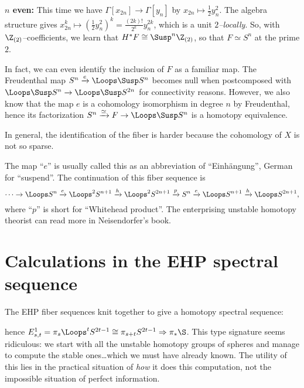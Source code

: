 \textbf{$n$ even:} This time we have $\Gamma[x_{2n}] \to \Gamma[y_n]$ by $x_{2n} \mapsto \frac{1}{2} y_n^2$.  The algebra structure gives $x_{2n}^k \mapsto (\frac{1}{2} y_n^2)^k = \frac{(2k)!}{2^k} y_n^{2k}$, which is a unit \emph{$2$--locally}.  So, with $\Z_{(2)}$--coefficients, we learn that $H^* F \cong \Susp^n \Z_{(2)}$, so that $F \simeq S^n$ at the prime $2$.

In fact, we can even identify the inclusion of $F$ as a familiar map.  The Freudenthal map $S^n \xrightarrow e \Loops \Susp S^n$ becomes null when postcomposed with $\Loops \Susp S^n \to \Loops \Susp S^{2n}$ for connectivity reasons.  However, we also know that the map $e$ is a cohomology isomorphism in degree $n$ by Freudenthal, hence its factorization $S^n \xrightarrow\simeq F \to \Loops \Susp S^n$ is a homotopy equivalence.

\begin{remark}
In general, the identification of the fiber is harder because the cohomology of $X$ is not so sparse.
\end{remark}

\begin{remark}
The map ``$e$'' is usually called this as an abbreviation of ``Einh\"angung'', German for ``suspend''.  The continuation of this fiber sequence is \[\cdots \to \Loops S^n \xrightarrow e \Loops^2 S^{n+1} \xrightarrow h \Loops^2 S^{2n+1} \xrightarrow p S^n \xrightarrow e \Loops S^{n+1} \xrightarrow h \Loops S^{2n+1},\] where ``$p$'' is short for ``Whitehead product''.  The enterprising unstable homotopy theorist can read more in Neisendorfer's book.
\end{remark}




\section{Calculations in the EHP spectral sequence}

The EHP fiber sequences knit together to give a homotopy spectral sequence:
\begin{center}
\end{center}
hence $E^1_{s, t} = \pi_s \Loops^t S^{2t-1} \cong \pi_{s+t} S^{2t-1} \Rightarrow \pi_* \S$.  This type signature seems ridiculous: we start with all the unstable homotopy groups of spheres and manage to compute the stable ones\ldots which we must have already known.  The utility of this lies in the practical situation of \emph{how} it does this computation, not the impossible situation of perfect information.

